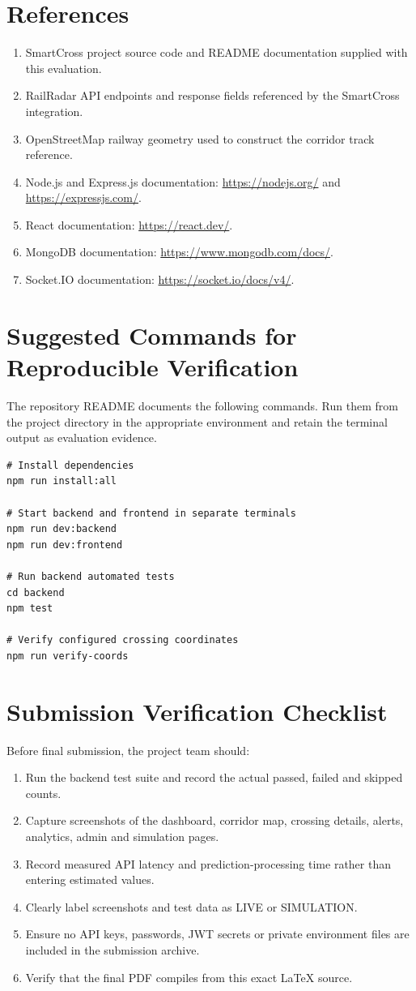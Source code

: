 \documentclass[11pt,a4paper]{report}
\begin{document}
\chapter*{References}
\begin{enumerate}
  \item SmartCross project source code and README documentation supplied with this evaluation.
  \item RailRadar API endpoints and response fields referenced by the SmartCross integration.
  \item OpenStreetMap railway geometry used to construct the corridor track reference.
  \item Node.js and Express.js documentation: \url{https://nodejs.org/} and \url{https://expressjs.com/}.
  \item React documentation: \url{https://react.dev/}.
  \item MongoDB documentation: \url{https://www.mongodb.com/docs/}.
  \item Socket.IO documentation: \url{https://socket.io/docs/v4/}.
\end{enumerate}

\appendix
\chapter{Suggested Commands for Reproducible Verification}
The repository README documents the following commands. Run them from the project directory in the appropriate environment and retain the terminal output as evaluation evidence.

\begin{verbatim}
# Install dependencies
npm run install:all

# Start backend and frontend in separate terminals
npm run dev:backend
npm run dev:frontend

# Run backend automated tests
cd backend
npm test

# Verify configured crossing coordinates
npm run verify-coords
\end{verbatim}

\chapter{Submission Verification Checklist}
Before final submission, the project team should:
\begin{enumerate}
  \item Run the backend test suite and record the actual passed, failed and skipped counts.
  \item Capture screenshots of the dashboard, corridor map, crossing details, alerts, analytics, admin and simulation pages.
  \item Record measured API latency and prediction-processing time rather than entering estimated values.
  \item Clearly label screenshots and test data as LIVE or SIMULATION.
  \item Ensure no API keys, passwords, JWT secrets or private environment files are included in the submission archive.
  \item Verify that the final PDF compiles from this exact LaTeX source.
\end{enumerate}
\end{document}
